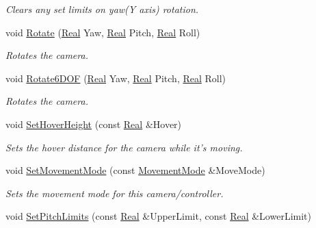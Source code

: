 \begin{DoxyCompactItemize}
\begin{DoxyCompactList}\small\item\em Clears any set limits on yaw(Y axis) rotation. \item\end{DoxyCompactList}\item 
void \hyperlink{classphys_1_1CameraController_a3ad0f3ecf0777a8feb2e4f22f2d644bf}{Rotate} (\hyperlink{namespacephys_af7eb897198d265b8e868f45240230d5f}{Real} Yaw, \hyperlink{namespacephys_af7eb897198d265b8e868f45240230d5f}{Real} Pitch, \hyperlink{namespacephys_af7eb897198d265b8e868f45240230d5f}{Real} Roll)
\begin{DoxyCompactList}\small\item\em Rotates the camera. \item\end{DoxyCompactList}\item 
void \hyperlink{classphys_1_1CameraController_a23d1b811021fc77135a556de86f4f32a}{Rotate6DOF} (\hyperlink{namespacephys_af7eb897198d265b8e868f45240230d5f}{Real} Yaw, \hyperlink{namespacephys_af7eb897198d265b8e868f45240230d5f}{Real} Pitch, \hyperlink{namespacephys_af7eb897198d265b8e868f45240230d5f}{Real} Roll)
\begin{DoxyCompactList}\small\item\em Rotates the camera. \item\end{DoxyCompactList}\item 
void \hyperlink{classphys_1_1CameraController_a188b2fe215da11a2afc60e1b69b42c09}{SetHoverHeight} (const \hyperlink{namespacephys_af7eb897198d265b8e868f45240230d5f}{Real} \&Hover)
\begin{DoxyCompactList}\small\item\em Sets the hover distance for the camera while it's moving. \item\end{DoxyCompactList}\item 
void \hyperlink{classphys_1_1CameraController_aa8e4d48573a2443af3b2111ab82f8a17}{SetMovementMode} (const \hyperlink{classphys_1_1CameraController_af7ea701f4b768a0335e8e0115d516af8}{MovementMode} \&MoveMode)
\begin{DoxyCompactList}\small\item\em Sets the movement mode for this camera/controller. \item\end{DoxyCompactList}\item 
void \hyperlink{classphys_1_1CameraController_a9ca0500582f46a20189cdc39555b79b3}{SetPitchLimits} (const \hyperlink{namespacephys_af7eb897198d265b8e868f45240230d5f}{Real} \&UpperLimit, const \hyperlink{namespacephys_af7eb897198d265b8e868f45240230d5f}{Real} \&LowerLimit)

\end{DoxyCompactItemize}
